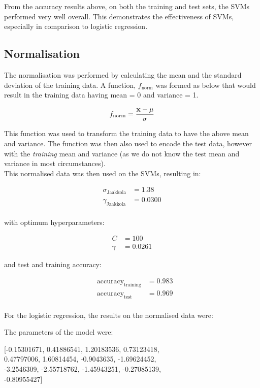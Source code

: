 \documentclass{scrartcl}
\begin{document}
From the accuracy results above, on both the training and test sets, the SVMs performed very well overall. This demonstrates the effectiveness of SVMs, especially in comparison to logistic regression.

\subsection{Normalisation}

The normalisation was performed by calculating the mean and the standard deviation of the training data. A function, $f_{\text{norm}}$ was formed as below that would result in the training data having mean = 0 and variance = 1.

\[ f_{\text{norm}} = \frac {{\mathbf x} - \mu} {\sigma} \]

This function was used to transform the training data to have the above mean and variance. The function was then also used to encode the test data, however with the \emph{training} mean and variance (as we do not know the test mean and variance in most circumstances). \\

This normalised data was then used on the SVMs, resulting in:

\begin{align*}
    \sigma_{\text{Jaakkola}} &= 1.38   \\
    \gamma_{\text{Jaakkola}} &= 0.0300 \\
\end{align*}

with optimum hyperparameters:

\begin{align*}
    C &= 100 \\
    \gamma &= 0.0261
\end{align*}

and test and training accuracy:

\begin{align*}
    & \text{accuracy}_{\text{training}}   &= 0.983 \\
    & \text{accuracy}_{\text{test}}       &= 0.969 \\
\end{align*}

For the logistic regression, the results on the normalised data were:

The parameters of the model were:

\begin{center}
 [-0.15301671,  0.41886541,  1.20183536,  0.73123418, \\
   0.47797006,  1.60814454, -0.9043635, -1.69624452, \\
  -3.2546309, -2.55718762, -1.45943251, -0.27085139, \\
  -0.80955427]
\end{center}
\end{document}

